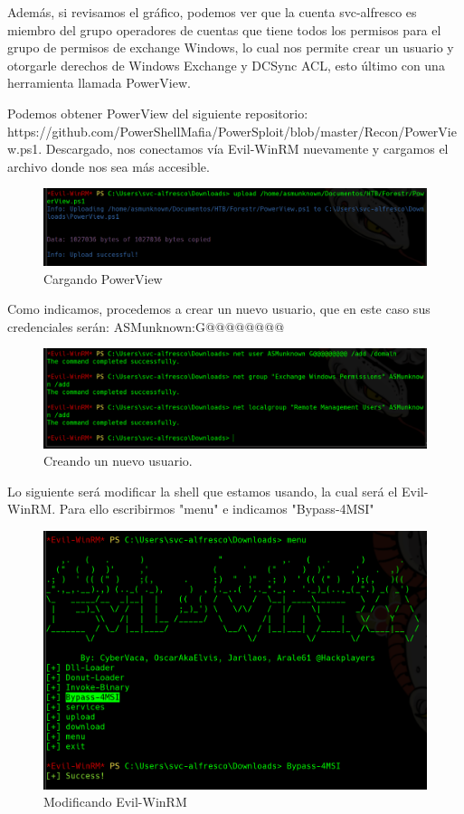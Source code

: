 \documentclass{article}
\begin{document}
Además, si revisamos el gráfico, podemos ver que la cuenta svc-alfresco es miembro del grupo operadores de cuentas que tiene todos los permisos para el grupo de permisos de exchange Windows, lo cual nos permite crear un usuario y otorgarle derechos de Windows Exchange y DCSync ACL, esto último con una herramienta llamada PowerView.

Podemos obtener PowerView del siguiente repositorio: https://github.com/PowerShellMafia/PowerSploit/blob/master/Recon/PowerView.ps1. Descargado, nos conectamos vía Evil-WinRM nuevamente y cargamos el archivo donde nos sea más accesible.

\begin{figure}[H]
	\center
	\includegraphics[width=\textwidth]{images/forest/cargamos_powerviewwer.png}
	\caption{Cargando PowerView}
\end{figure}

Como indicamos, procedemos a crear un nuevo usuario, que en este caso sus credenciales serán: ASMunknown:G@@@@@@@@

\begin{figure}[H]
	\center
	\includegraphics[width=\textwidth]{images/forest/creando-usuario-nuevo-chetao.png}
	\caption{Creando un nuevo usuario.}
\end{figure}

Lo siguiente será modificar la shell que estamos usando, la cual será el Evil-WinRM. Para ello escribirmos "menu" e indicamos "Bypass-4MSI"

\begin{figure}[H]
	\center
	\includegraphics[width=\textwidth]{images/forest/modificnadoWinRM-Bypoass.png}
	\caption{Modificando Evil-WinRM}
\end{figure}
\end{document}
